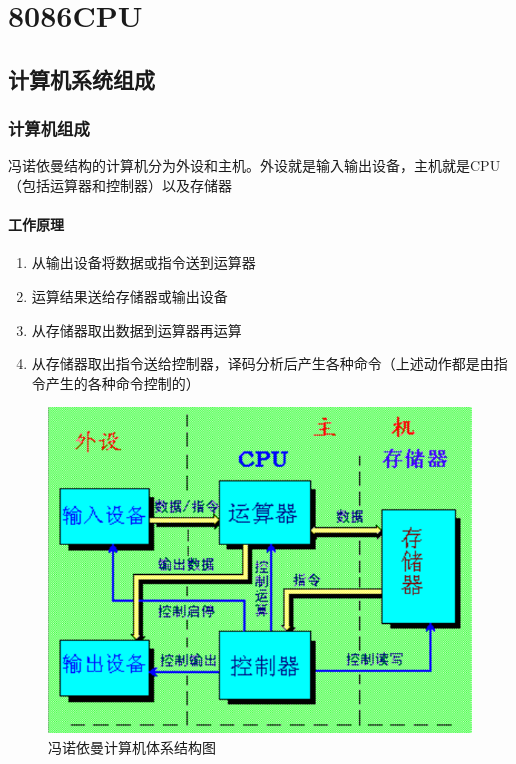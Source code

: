 \chapter{8086CPU}
\section{计算机系统组成}
\subsection{计算机组成}
冯诺依曼结构的计算机分为外设和主机。外设就是输入输出设备，主机就是CPU（包括运算器和控制器）以及存储器
\subsubsection{工作原理}
\begin{enumerate}
    \item 从输出设备将数据或指令送到运算器
    \item 运算结果送给存储器或输出设备
    \item 从存储器取出数据到运算器再运算
    \item 从存储器取出指令送给控制器，译码分析后产生各种命令（上述动作都是由指令产生的各种命令控制的）
\end{enumerate}
\begin{figure}[H]
    \centering
    \includegraphics[scale=1]{part_8086CPU/part_8086CPU_pic/冯诺依曼计算机体系结构.png}
    \caption{冯诺依曼计算机体系结构图}
\end{figure}
